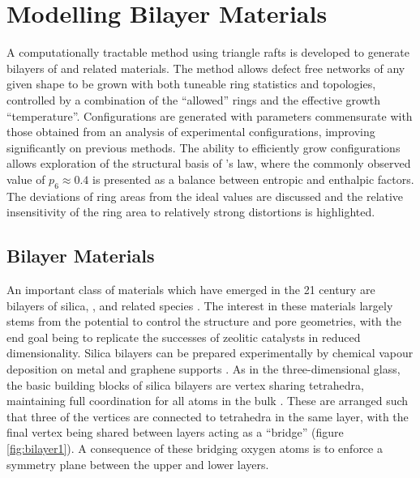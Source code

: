 \chapter[Modelling Bilayer Materials]{Modelling Bilayer Materials}
\label{ch:bilayers}

\begin{chapterabstract}
A computationally tractable \mc{} method using triangle rafts is developed to generate bilayers of \sioii{} and related materials.
The method allows defect free networks of any given shape to be grown with both tuneable ring statistics and topologies, controlled by a combination of the ``allowed'' rings and the effective growth ``temperature''. 
Configurations are generated with \aw{} parameters commensurate with those obtained from an analysis of experimental configurations, improving significantly on previous methods.
The ability to efficiently grow configurations allows exploration of the structural basis of \lm’s law, where the commonly observed value of $p_6\approx0.4$ is presented as a balance between entropic and enthalpic factors. 
The deviations of ring areas from the ideal values are discussed and the relative insensitivity of the ring area to relatively strong distortions is highlighted.
\end{chapterabstract}

\section{Bilayer Materials}

An important class of \td{} materials which have emerged in the 21\st{} century are bilayers of silica, \sioii, and related species \cite{Buchner2017}.
The interest in these materials largely stems from the potential to control the structure and pore geometries, with the end goal being to replicate the successes of zeolitic catalysts in reduced dimensionality. 
Silica bilayers can be prepared experimentally by chemical vapour deposition on metal and graphene supports \cite{Huang2012,Lichtenstein2012a}.
As in the three\--dimensional glass, the basic building blocks of silica bilayers are vertex sharing \sioiv{} tetrahedra, maintaining full coordination for all atoms in the bulk \cite{Wilson2013}.
These are arranged such that three of the vertices are connected to tetrahedra in the same layer, with the final vertex being shared between layers acting as a ``bridge'' (figure \ref{fig:bilayer1}).
A consequence of these bridging oxygen atoms is to enforce a symmetry plane between the upper and lower layers.


